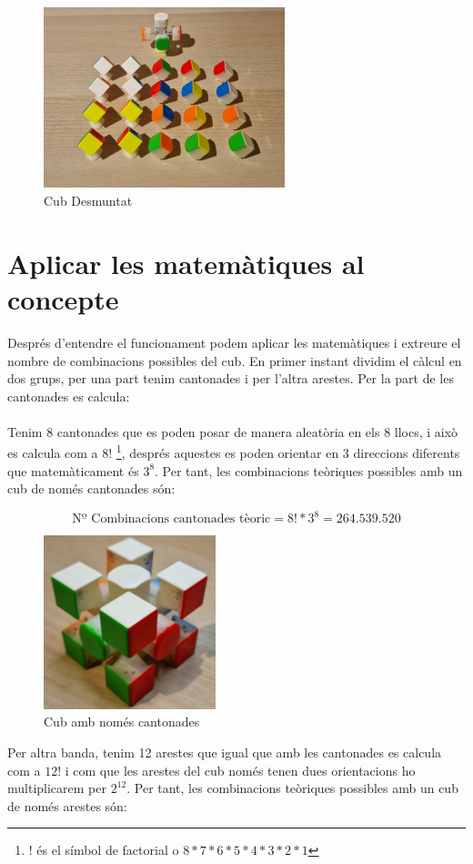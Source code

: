 \begin{figure}[ht]
    \centering
    \includegraphics[width=7cm]{img/figures/cub-desmontat.jpg}
    \caption{Cub Desmuntat}
    \label{fig:cub-desmuntat}
\end{figure}

\section{Aplicar les matemàtiques al concepte}

Després d'entendre el funcionament podem aplicar les matemàtiques i extreure el nombre de combinacions possibles del cub. En primer instant dividim el càlcul en dos grups, per una part tenim cantonades i per l'altra arestes.
Per la part de les cantonades es calcula:
\\\\Tenim 8 cantonades que es poden posar de manera aleatòria en els 8 llocs, i això es calcula com a $ 8! $ \footnote{! és el símbol de factorial o $8*7*6*5*4*3*2*1$}, després aquestes es poden orientar en 3 direccions diferents que matemàticament és $ 3^8 $. Per tant, les combinacions teòriques possibles amb un cub de només cantonades són:

$$ \textrm{Nº Combinacions cantonades tèoric} = 8!*3^8 = 264.539.520 $$

\begin{figure}[h]
    \centering
    \includegraphics[width=5cm]{img/figures/only-corners.jpg}
    \caption{Cub amb només cantonades}
    \label{fig:only-corners}
\end{figure}
Per altra banda, tenim 12 arestes que igual que amb les cantonades es calcula com a $ 12! $ i com que les arestes del cub només tenen dues orientacions ho multiplicarem per $2^12$. Per tant, les combinacions teòriques possibles amb un cub de només arestes són:  

